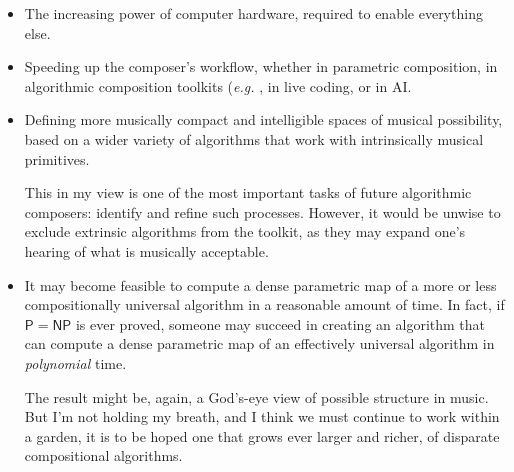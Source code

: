 \documentclass[11pt,papersize=a4]{scrartcl}
\begin{document}
\begin{itemize}
\item The increasing power of computer hardware, required to enable everything else.
\item Speeding up the composer's workflow, whether in parametric composition, in algorithmic composition toolkits (\emph{e.g.} \parencite{bellingham2019toward}, in live coding, or in AI.
\item Defining more musically compact and intelligible spaces of musical possibility, based on a wider variety of algorithms that work with intrinsically musical primitives. 

This in my view is one of the most important tasks of future algorithmic composers: identify and refine such processes. However, it would be unwise to exclude extrinsic algorithms from the toolkit, as they may expand one's hearing of what is musically acceptable.
\item  It may become feasible to compute a dense parametric map of a more or less compositionally universal algorithm in a reasonable amount of time. In fact, if $\mathsf{P} = \mathsf{NP}$ is ever proved, someone may succeed in creating an algorithm that can compute a dense parametric map of an effectively universal algorithm in \emph{polynomial} time. 

The result might be, again, a God's-eye view of possible structure in music. But I'm not holding my breath, and I think we must continue to work within a garden, it is to be hoped one that grows ever larger and richer, of disparate compositional algorithms.
\end{itemize}


\printbibliography
\end{document}
